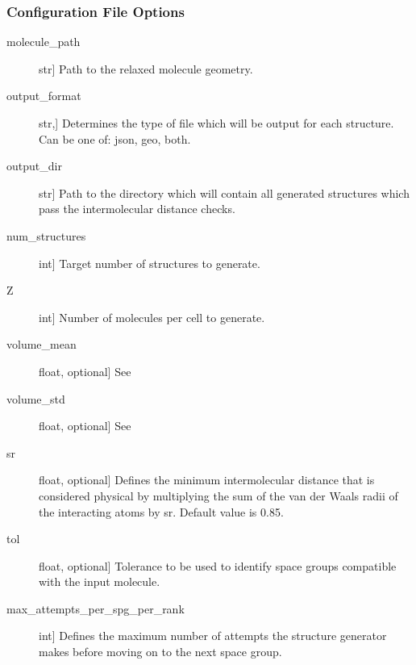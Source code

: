 \documentclass[letterpaper,10pt,english]{sphinxmanual}
\begin{document}
\begin{fulllineitems}
\begin{fulllineitems}
\begin{quote}
\begin{description}
\end{description}\end{quote}
\subsubsection*{Configuration File Options}
\begin{description}
\item[{molecule\_path}] \leavevmode{[}str{]}
Path to the relaxed molecule geometry.

\item[{output\_format}] \leavevmode{[}str,{]}
Determines the type of file which will be output for each
structure. Can be one of: json, geo, both.

\item[{output\_dir}] \leavevmode{[}str{]}
Path to the directory which will contain all generated structures
which pass the intermolecular distance checks.

\item[{num\_structures}] \leavevmode{[}int{]}
Target number of structures to generate.

\item[{Z}] \leavevmode{[}int{]}
Number of molecules per cell to generate.

\item[{volume\_mean}] \leavevmode{[}float, optional{]}
See {\hyperref[\detokenize{index:Genarris.genarris_master.Genarris.Estimate_Unit_Cell_Volume}]{}}

\item[{volume\_std}] \leavevmode{[}float, optional{]}
See {\hyperref[\detokenize{index:Genarris.genarris_master.Genarris.Estimate_Unit_Cell_Volume}]{}}

\item[{sr}] \leavevmode{[}float, optional{]}
Defines the minimum intermolecular distance that is considered
physical by multiplying the sum of the van der Waals radii of the
interacting atoms by sr. Default value is 0.85.

\item[{tol}] \leavevmode{[}float, optional{]}
Tolerance to be used to identify space groups compatible with the
input molecule.

\item[{max\_attempts\_per\_spg\_per\_rank}] \leavevmode{[}int{]}
Defines the maximum number of attempts the structure generator
makes before moving on to the next space group.


\end{description}
\end{fulllineitems}
\end{fulllineitems}
\end{document}
